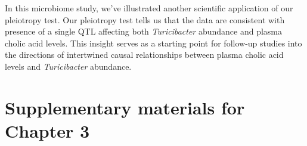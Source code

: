 \documentclass[oneside]{book}\usepackage[]{graphicx}\usepackage[]{color}
\begin{document}
In this microbiome study, we've illustrated another scientific application of our pleiotropy test. 
Our pleiotropy test tells us that 
the data are consistent with presence of a single QTL affecting both
\emph{Turicibacter} abundance and plasma cholic acid levels. 
This insight serves as a starting point for follow-up studies into the directions of 
intertwined causal relationships between plasma cholic acid levels and \emph{Turicibacter} abundance.




\section{Supplementary materials for Chapter 3}

\end{document}
